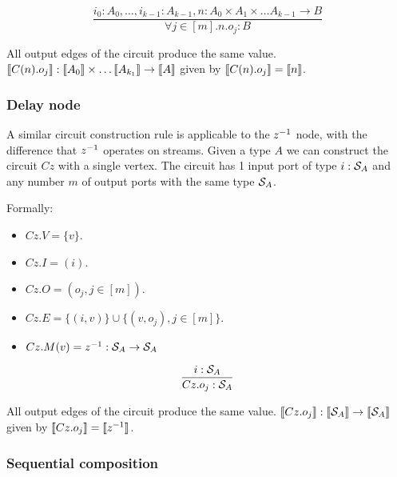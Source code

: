 $$\frac{
i_0: A_0, \ldots, i_{k-1}: A_{k-1}, n: A_0 \times A_1 \times \ldots A_{k-1} \rightarrow B
}{
\forall j \in [m] . n.o_j: B}$$

All output edges of the circuit produce the same value.
$\llbracket C(n).o_j \rrbracket: \llbracket A_0 \rrbracket \times \ldots \llbracket A_{k_1} \rrbracket \rightarrow \llbracket A \rrbracket$
given by $\llbracket C(n).o_j \rrbracket = \llbracket n \rrbracket$.

\subsubsection{Delay node}

A similar circuit construction rule is applicable to the $z^{-1}$ node, with the difference that
$z^{-1}$ operates on streams.  Given a type $A$ we can construct the circuit $Cz$ with a single vertex.
The circuit has 1 input port of type $i: \mathcal{S}_{A}$
and any number $m$ of output ports with the same type $\mathcal{S}_{A}$.


Formally:

\begin{itemize}
    \item $Cz.V = \{ v \}$.
    \item $Cz.I = (i)$.
    \item $Cz.O = (o_j, j \in [m])$.
    \item $Cz.E = \{ (i, v) \} \cup \{ (v, o_j), j \in [m] \}$.
    \item $Cz.M(v) = z^{-1}: \mathcal{S}_{A} \rightarrow \mathcal{S}_{A}$
\end{itemize}

$$\frac{i: \mathcal{S}_{A}}{Cz.o_j: \mathcal{S}_{A}}$$

All output edges of the circuit produce the same value.
$\llbracket Cz.o_j \rrbracket: \llbracket \mathcal{S}_{A} \rrbracket \rightarrow \llbracket \mathcal{S}_{A} \rrbracket$
given by $\llbracket Cz.o_j \rrbracket = \llbracket z^{-1} \rrbracket$.

\subsubsection{Sequential composition}

